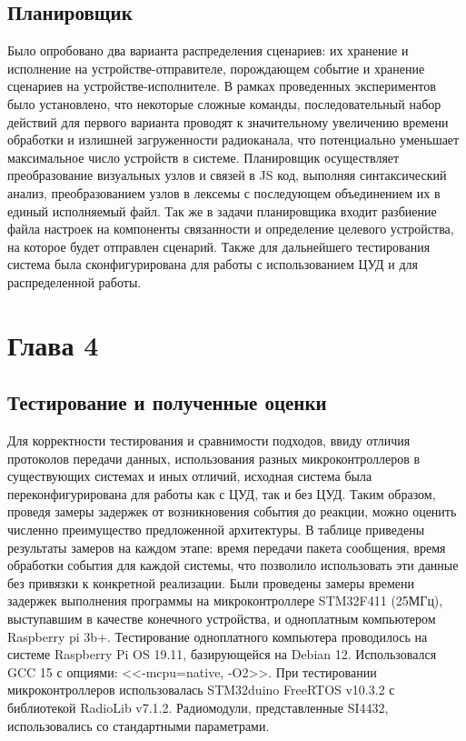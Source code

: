 \documentclass[14pt,a4paper]{extarticle}
\begin{document}
\subsection{Планировщик}
Было опробовано два варианта распределения сценариев: их хранение и исполнение на устройстве-отправителе, порождающем событие и хранение сценариев на устройстве-исполнителе. В рамках проведенных экспериментов было установлено, что некоторые сложные команды, последовательный набор действий для первого варианта проводят к значительному увеличению времени обработки и излишней загруженности радиоканала, что потенциально уменьшает максимальное число устройств в системе.
Планировщик осуществляет преобразование визуальных узлов и связей в JS код, выполняя синтаксический анализ, преобразованием узлов в лексемы с последующем объединением их в единый исполняемый файл. Так же в задачи планировщика входит разбиение файла настроек на компоненты связанности и определение целевого устройства, на которое будет отправлен сценарий.
Также для дальнейшего тестирования система была сконфигурирована для работы с использованием ЦУД и для распределенной работы.

\newpage

\section{Глава 4}
\subsection{Тестирование и полученные оценки}
Для корректности тестирования и сравнимости подходов, ввиду отличия протоколов передачи данных, использования разных
микроконтроллеров в существующих системах и иных отличий, исходная система была переконфигурирована для работы как с
ЦУД, так и без ЦУД. Таким образом, проведя замеры задержек от возникновения события до реакции, можно оценить численно
преимущество предложенной архитектуры. В таблице приведены результаты замеров на каждом этапе: время передачи
пакета сообщения, время обработки события для каждой системы, что позволило использовать эти данные без привязки к
конкретной реализации. Были проведены замеры времени задержек выполнения программы на микроконтроллере STM32F411
(25МГц), выступавшим в качестве конечного устройства, и одноплатным компьютером Raspberry pi 3b+. Тестирование
одноплатного компьютера проводилось на системе Raspberry Pi OS 19.11, базирующейся на Debian 12. Использовался GCC 15
с опциями: <<-mcpu=native, -O2>>. При тестировании микроконтроллеров использовалась STM32duino FreeRTOS v10.3.2 с
библиотекой RadioLib v7.1.2. Радиомодули, представленные SI4432, использовались со стандартными параметрами.
\end{document}
